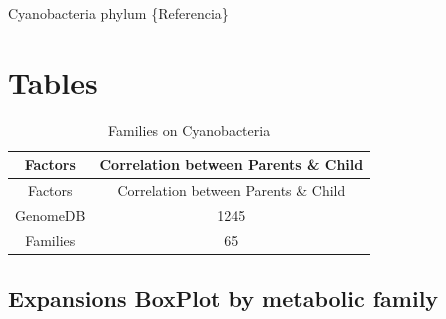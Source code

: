 \documentclass[12pt,twoside]{reedthesis}
\begin{document}
  Cyanobacteria phylum \{Referencia\}
  
  \section{Tables}\label{tables-2}
  
  \begin{longtable}[c]{@{}cc@{}}
  \caption{Families on Cyanobacteria \label{tab:inher}}\tabularnewline
  \toprule
  Factors & Correlation between Parents \& Child\tabularnewline
  \midrule
  \endfirsthead
  \toprule
  Factors & Correlation between Parents \& Child\tabularnewline
  \midrule
  \endhead
  GenomeDB & 1245\tabularnewline
  Families & 65\tabularnewline
  \bottomrule
  \end{longtable}
  
  \clearpage
  
  \subsection{Expansions BoxPlot by metabolic
  family}\label{expansions-boxplot-by-metabolic-family-2}
  
  \begin{Shaded}
  \begin{Highlighting}[]
  \NormalTok{(} \NormalTok{, } \NormalTok{,} \NormalTok{, } \NormalTok{)}
  \end{Highlighting}
  \end{Shaded}
  
\end{document}
